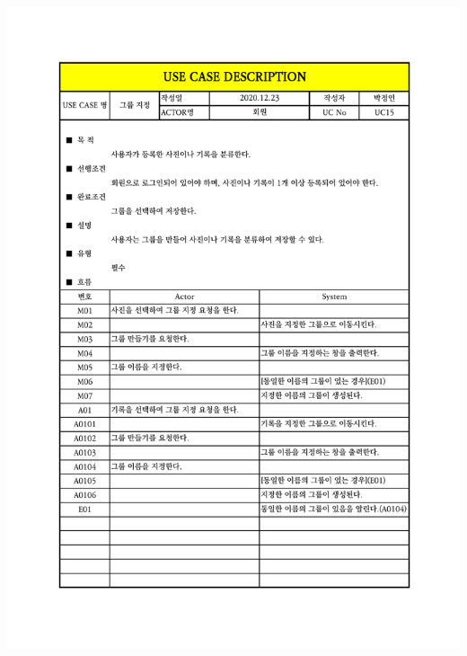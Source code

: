 {{{{{{{{{{{{{{{{{\includegraphics[width=1.1\textwidth]{./Figure/Design/Display/usecase/015.pdf} \\
}}}}}}}}}}}}}}}}}
